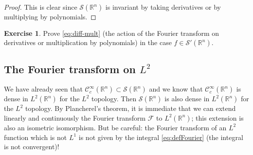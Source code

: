 \documentclass[a4paper, 12pt]{article}
\theoremstyle{plain}
\theoremstyle{definition}
\newtheorem{exercise}{Exercise}
\theoremstyle{remark}
\numberwithin{equation}{section}
\begin{document}
\begin{proof}
This is clear since ${\mathscr{S}}({\mathds{R}}^n)$ is invariant by taking derivatives or by multiplying by polynomials.
\end{proof}

\begin{exercise}
Prove \eqref{eq:diff-mult} (the action of the Fourier transform on derivatives or multiplication by polynomials)
in the case $f\in{\mathscr{S}}'({\mathds{R}}^n)$.
\end{exercise}

\subsection{The Fourier transform on $L^2$}

We have already seen that ${\mathscr{C}}_c^\infty({\mathds{R}}^n)\subset {\mathscr{S}}({\mathds{R}}^n)$ and we know that 
${\mathscr{C}}_c^\infty({\mathds{R}}^n)$ is dense in $L^2({\mathds{R}}^n)$ for the $L^2$ topology. Then ${\mathscr{S}}({\mathds{R}}^n)$
is also dense in $L^2({\mathds{R}}^n)$ for the $L^2$ topology. By Plancherel's theorem, it is immediate that we can
extend linearly and continuously the Fourier transform ${\mathscr{F}}$ to $L^2({\mathds{R}}^n)$; this extension is also an isometric
isomorphism. But be careful: the Fourier transform of an $L^2$ function which is not $L^1$ is not given by the integral \eqref{eq:defFourier}
(the integral is not convergent)!
\end{document}
